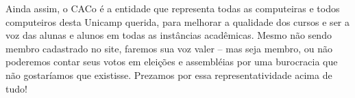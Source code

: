 Ainda assim, o CACo é a entidade que representa todas as computeiras e todos
computeiros desta Unicamp querida, para melhorar a qualidade dos cursos e ser a
voz das alunas e alunos em todas as instâncias acadêmicas. Mesmo não sendo
membro cadastrado no site, faremos sua voz valer -- mas seja membro, ou não
poderemos contar seus votos em eleições e assembléias por uma burocracia que
não gostaríamos que existisse. Prezamos por essa representatividade acima de
tudo!
